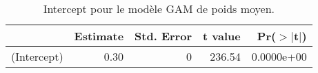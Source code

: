\begin{table}[!ht]
\centering
\begin{tabular}{rrrrr}
  \hline
 & Estimate & Std. Error & t value & Pr($>$$|$t$|$) \\ 
  \hline
(Intercept) & 0.30 &    0 & 236.54 & 0.0000e+00 \\ 
   \hline
\end{tabular}
\caption{Intercept pour le modèle GAM de poids moyen.} 
\label{smpm.pc}
\end{table}

